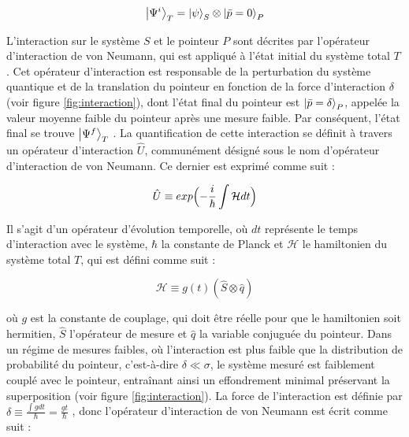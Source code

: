 \begin{onehalfspace}
    \begin{equation}
        \ket{\Psi^i}_T = \ket{\psi}_S \otimes \ket{\bar{p} = 0}_P
    \end{equation}

    \noindent L’interaction sur le système $S$ et le pointeur $P$ sont
    décrites par l’opérateur 
    d’interaction de von Neumann, qui est appliqué à l’état
    initial du système total $T$ \cite{vonNeumann}. Cet opérateur d’interaction est 
    responsable de la perturbation du système quantique et de la 
    translation du pointeur en fonction de la force d’interaction $\delta$ 
    (voir figure \ref{fig:interaction}), dont l'état final du pointeur est 
    $\ket{\bar{p} = \delta}_P$, appelée la valeur moyenne 
    faible du pointeur après une mesure faible. Par conséquent, l'état final se trouve $\ket{\Psi^f}_T$ 
    \cite{Lundeen_Bamber,Hairiri,vonNeumann}. La quantification de cette interaction 
    se définit à travers un opérateur d’interaction $\hat{U}$, 
    communément désigné sous le nom d’opérateur d’interaction de 
    von Neumann. Ce dernier est 
    exprimé comme suit :

    \begin{equation}
        \hat{U} \equiv exp\Bigl( -\frac{i}{\hbar}\int \mathcal{H} dt \Bigr)
    \end{equation}

    \noindent Il s'agit d'un opérateur d'évolution temporelle, où $dt$ 
    représente le temps d'interaction avec le système, $\hbar$ la 
    constante de Planck et $\mathcal{H}$ le hamiltonien du système total 
    $T$, qui est défini comme suit :

    \begin{equation}
        \mathcal{H} \equiv g(t)(\hat{S} \otimes \hat{q})
    \end{equation}

    \noindent où $g$ est la constante de couplage, qui doit être réelle 
    pour que le hamiltonien soit hermitien, $\hat{S}$ l'opérateur de mesure 
    et $\hat{q}$ la variable conjuguée du pointeur. Dans un régime de mesures faibles, où l’interaction est 
    plus faible que la distribution de probabilité du pointeur, 
    c’est-à-dire $\delta \ll \sigma$, le système mesuré est faiblement 
    couplé avec le pointeur, entraînant ainsi un effondrement minimal 
    préservant la superposition (voir figure \ref{fig:interaction}).
    La force de l'interaction est définie par 
    $\delta \equiv \frac{\int g dt}{\hbar} = \frac{gt}{\hbar}$ \cite{Lundeen_Resch,Lundeen_thesis}, 
    donc l'opérateur d'interaction de von Neumann est écrit comme suit :


\end{onehalfspace}
